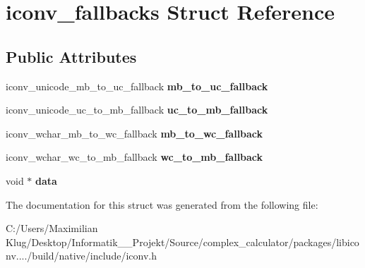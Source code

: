 \hypertarget{structiconv__fallbacks}{}\section{iconv\+\_\+fallbacks Struct Reference}
\label{structiconv__fallbacks}
\subsection*{Public Attributes}
\begin{DoxyCompactItemize}
\item 
\mbox{\label{structiconv__fallbacks_a93d1f15b4c5673876a521c0a5bb6eb5a}} 
iconv\+\_\+unicode\+\_\+mb\+\_\+to\+\_\+uc\+\_\+fallback {\bfseries mb\+\_\+to\+\_\+uc\+\_\+fallback}
\item 
\mbox{\label{structiconv__fallbacks_a3f81942524576f8a28cb6f4827095cf1}} 
iconv\+\_\+unicode\+\_\+uc\+\_\+to\+\_\+mb\+\_\+fallback {\bfseries uc\+\_\+to\+\_\+mb\+\_\+fallback}
\item 
\mbox{\label{structiconv__fallbacks_a5a13c8c33c8d32694e17574bf44f5037}} 
iconv\+\_\+wchar\+\_\+mb\+\_\+to\+\_\+wc\+\_\+fallback {\bfseries mb\+\_\+to\+\_\+wc\+\_\+fallback}
\item 
\mbox{\label{structiconv__fallbacks_a215d22f9b9df99a1125e993e9b88aa11}} 
iconv\+\_\+wchar\+\_\+wc\+\_\+to\+\_\+mb\+\_\+fallback {\bfseries wc\+\_\+to\+\_\+mb\+\_\+fallback}
\item 
\mbox{\label{structiconv__fallbacks_a91541be5a0f51e458f4e175a4df88016}} 
void $\ast$ {\bfseries data}
\end{DoxyCompactItemize}


The documentation for this struct was generated from the following file\+:\begin{DoxyCompactItemize}
\item 
C\+:/\+Users/\+Maximilian Klug/\+Desktop/\+Informatik\+\_\+\_\+\+Projekt/\+Source/complex\+\_\+calculator/packages/libiconv..../build/native/include/iconv.\+h\end{DoxyCompactItemize}
